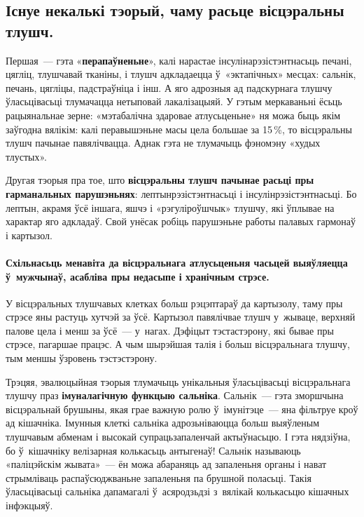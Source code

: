 \subsection*{Існуе некалькі тэорый, чаму расьце вісцэральны тлушч.}
Першая~--- гэта «\textbf{перапаўненьне}», калі нарастае інсулінарэзістэнтнасьць печані, цягліц, тлушчавай тканіны, і тлушч адкладаецца ў~«эктапічных» месцах: сальнік, печань, цягліцы, падстраўніца і інш. А яго адрозныя ад падскурнага тлушчу ўласьцівасьці тлумачацца нетыповай лакалізацыяй. У гэтым меркаваньні ёсьць рацыянальнае зерне: «мэтабалічна здаровае атлусьценьне» ня можа быць якім заўгодна вялікім: калі перавышэньне масы цела большае за 15\,\%, то вісцэральны тлушч пачынае павялічвацца. Аднак гэта не тлумачыць фэномэну «худых тлустых».

Другая тэорыя пра тое, што \textbf{вісцэральны тлушч пачынае расьці пры гарманальных парушэньнях}: лептынрэзістэнтнасьці і інсулінрэзістэнтнасьці. Бо лептын, акрамя ўсё іншага, яшчэ і «рэгуліроўшчык» тлушчу, які ўплывае на характар яго адкладаў. Свой унёсак робіць парушэньне работы палавых гармонаў і картызол.

\paragraph{Схільнасьць менавіта да вісцэральнага атлусьценьня часьцей выяўляецца ў~мужчынаў, асабліва пры недасыпе і хранічным стрэсе.} У вісцэральных тлушчавых клетках больш рэцэптараў да картызолу, таму пры стрэсе яны растуць хутчэй за ўсё. Картызол павялічвае тлушч у~жываце, верхняй палове цела і менш за ўсё~--- у~нагах. Дэфіцыт тэстастэрону, які бывае пры стрэсе, пагаршае працэс. А чым шырэйшая талія і больш вісцэральнага тлушчу, тым меншы ўзровень тэстэстэрону.

Трэцяя, эвалюцыйная тэорыя тлумачыць унікальныя ўласьцівасьці вісцэральнага тлушчу праз \textbf{імуналагічную функцыю сальніка}. Сальнік~--- гэта зморшчына вісцэральнай брушыны, якая грае важную ролю ў~імунітэце~--- яна фільтруе кроў ад кішачніка. Імунныя клеткі сальніка адрозьніваюцца больш выяўленым тлушчавым абменам і высокай супрацьзапаленчай актыўнасьцю. І гэта нядзіўна, бо ў~кішачніку велізарная колькасьць антыгенаў! Сальнік называюць «паліцэйскім жывата»~--- ён можа абараняць ад запаленьня органы і нават стрымліваць распаўсюджваньне запаленьня па брушной поласьці. Такія ўласьцівасьці сальніка дапамагалі ў~асяродзьдзі з~вялікай колькасьцю кішачных інфэкцыяў.

